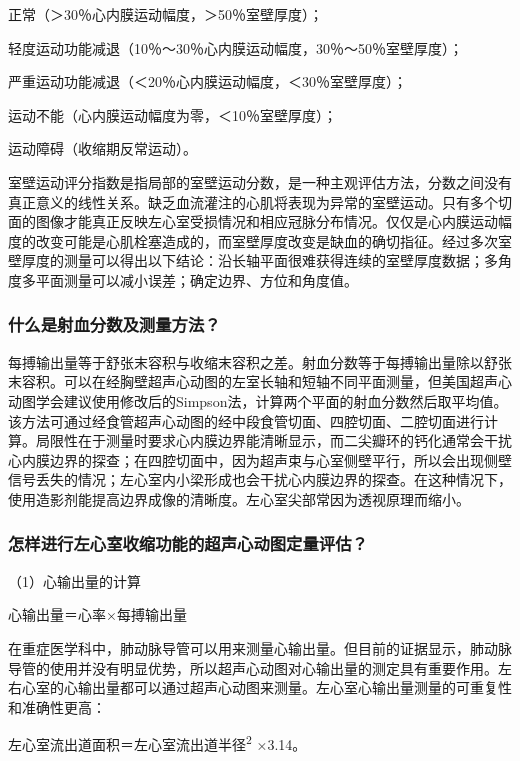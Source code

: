 正常（＞30％心内膜运动幅度，＞50％室壁厚度）；

轻度运动功能减退（10％～30％心内膜运动幅度，30％～50％室壁厚度）；

严重运动功能减退（＜20％心内膜运动幅度，＜30％室壁厚度）；

运动不能（心内膜运动幅度为零，＜10％室壁厚度）；

运动障碍（收缩期反常运动）。

室壁运动评分指数是指局部的室壁运动分数，是一种主观评估方法，分数之间没有真正意义的线性关系。缺乏血流灌注的心肌将表现为异常的室壁运动。只有多个切面的图像才能真正反映左心室受损情况和相应冠脉分布情况。仅仅是心内膜运动幅度的改变可能是心肌栓塞造成的，而室壁厚度改变是缺血的确切指征。经过多次室壁厚度的测量可以得出以下结论：沿长轴平面很难获得连续的室壁厚度数据；多角度多平面测量可以减小误差；确定边界、方位和角度值。

\subsubsection{什么是射血分数及测量方法？}

每搏输出量等于舒张末容积与收缩末容积之差。射血分数等于每搏输出量除以舒张末容积。可以在经胸壁超声心动图的左室长轴和短轴不同平面测量，但美国超声心动图学会建议使用修改后的Simpson法，计算两个平面的射血分数然后取平均值。该方法可通过经食管超声心动图的经中段食管切面、四腔切面、二腔切面进行计算。局限性在于测量时要求心内膜边界能清晰显示，而二尖瓣环的钙化通常会干扰心内膜边界的探查；在四腔切面中，因为超声束与心室侧壁平行，所以会出现侧壁信号丢失的情况；左心室内小梁形成也会干扰心内膜边界的探查。在这种情况下，使用造影剂能提高边界成像的清晰度。左心室尖部常因为透视原理而缩小。

\subsubsection{怎样进行左心室收缩功能的超声心动图定量评估？}

（1）心输出量的计算

心输出量＝心率×每搏输出量

在重症医学科中，肺动脉导管可以用来测量心输出量。但目前的证据显示，肺动脉导管的使用并没有明显优势，所以超声心动图对心输出量的测定具有重要作用。左右心室的心输出量都可以通过超声心动图来测量。左心室心输出量测量的可重复性和准确性更高：

左心室流出道面积＝左心室流出道半径\textsuperscript{2} ×3.14。

